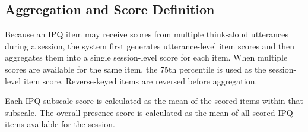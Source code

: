 

\subsection{Aggregation and Score Definition}

Because an IPQ item may receive scores from multiple think-aloud utterances during a session, the system first generates utterance-level item scores and then aggregates them into a single session-level score for each item. When multiple scores are available for the same item, the 75th percentile is used as the session-level item score. Reverse-keyed items are reversed before aggregation.

Each IPQ subscale score is calculated as the mean of the scored items within that subscale. The overall presence score is calculated as the mean of all scored IPQ items available for the session.

